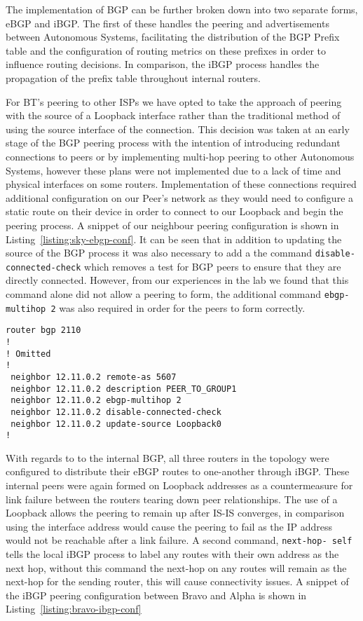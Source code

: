 The implementation of BGP can be further broken down into two separate forms,
eBGP and iBGP. The first of these handles the peering and advertisements between
Autonomous Systems, facilitating the distribution of the BGP Prefix table and
the configuration of routing metrics on these prefixes in order to influence
routing decisions. In comparison, the iBGP process handles the propagation of
the prefix table throughout internal routers.

For BT's peering to other ISPs we have opted to take the approach of peering
with the source of a Loopback interface rather than the traditional method of
using the source interface of the connection. This decision was taken at an
early stage of the BGP peering process with the intention of introducing
redundant connections to peers or by implementing multi-hop peering to other
Autonomous Systems, however these plans were not implemented due to a lack of
time and physical interfaces on some routers. Implementation of these
connections required additional configuration on our Peer's network as they
would need to configure a static route on their device in order to connect to
our Loopback and begin the peering process. A snippet of our neighbour peering
configuration is shown in Listing~\ref{listing:sky-ebgp-conf}. It can be seen
that in addition to updating the source of the BGP process it was also necessary
to add a the command \texttt{disable-connected-check} which removes a test for
BGP peers to ensure that they are directly connected. However, from our
experiences in the lab we found that this command alone did not allow a peering
to form, the additional command \texttt{ebgp-multihop 2} was also required in
order for the peers to form correctly.

\begin{lstlisting}[caption={BT-Sky eBGP Configuration}, label={listing:sky-ebgp-conf}]
router bgp 2110
!
! Omitted
!
 neighbor 12.11.0.2 remote-as 5607
 neighbor 12.11.0.2 description PEER_TO_GROUP1
 neighbor 12.11.0.2 ebgp-multihop 2
 neighbor 12.11.0.2 disable-connected-check
 neighbor 12.11.0.2 update-source Loopback0
!
\end{lstlisting}

With regards to to the internal BGP, all three routers in the topology were
configured to distribute their eBGP routes to one-another through iBGP. These
internal peers were again formed on Loopback addresses as a countermeasure for
link failure between the routers tearing down peer relationships. The use of a
Loopback allows the peering to remain up after IS-IS converges, in comparison
using the interface address would cause the peering to fail as the IP address
would not be reachable after a link failure. A second command, \texttt{next-hop-
self} tells the local iBGP process to label any routes with their own address as
the next hop, without this command the next-hop on any routes will remain as the
next-hop for the sending router, this will cause connectivity issues. A snippet
of the iBGP peering configuration between Bravo and Alpha is shown in
Listing~\ref{listing:bravo-ibgp-conf}

